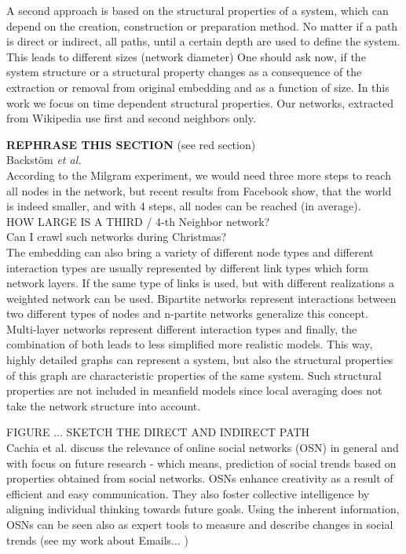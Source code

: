 \documentclass[a4paper,10pt]{scrbook}
\begin{document}
A second approach is based on the structural properties of a system, which can depend on the creation, construction or preparation method. No matter if a path is direct or indirect, all paths, until a certain depth are used to define the system. This leads to different sizes (network diameter) One should ask now, if the system structure or a structural property changes as a consequence of the extraction or removal from original embedding and as a function of size. In this work we focus on time dependent structural properties. Our networks, extracted from Wikipedia use first and second neighbors only. 

\textbf{REPHRASE THIS SECTION} (see red section)\\

Backstöm \textit{et al.} \cite{Backstrom2011} \\

According to the Milgram experiment, we would need three more steps to reach all nodes in the network, but recent results from Facebook show, that the world is indeed smaller, and with 4 steps, all nodes can be reached (in average).\\

HOW LARGE IS A THIRD / 4-th Neighbor network? \\

Can I crawl such networks during Christmas?\\

The embedding can also bring a variety of different node types and different interaction types are usually represented by different link types which form network layers. If the same type of links is used, but with different realizations a weighted network can be used. Bipartite networks represent interactions between two different types of nodes and n-partite networks generalize this concept. 
Multi-layer networks represent different interaction types and finally, the combination of both leads to less simplified more realistic models. This way, highly detailed graphs can represent a system, but also the structural properties of this graph are characteristic properties of the same system. Such structural properties are not included in meanfield models since local averaging does not take the network structure into account. 

FIGURE ... SKETCH THE DIRECT AND INDIRECT PATH\\

Cachia et al. \cite{Cachia2007} discuss the relevance of online social networks (OSN) in general and with focus on future research - which means, prediction of social trends based on properties obtained from social networks. OSNs enhance creativity as a result of efficient and easy communication. They also foster collective intelligence by aligning individual thinking towards future goals. Using the inherent information, OSNs can be seen also as expert tools to measure and describe changes in social trends (see my work about Emails...	 )  %
\end{document}

